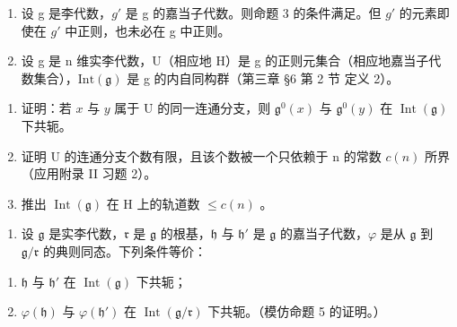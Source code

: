 
\begin{enumerate}
\def\labelenumi{\arabic{enumi})}
\item
  设 g 是李代数，\(g'\) 是 g 的嘉当子代数。则命题 3 的条件满足。但 \(g'\) 的元素即使在 \(g'\) 中正则，也未必在 g 中正则。
\item
  设 g 是 n 维实李代数，U（相应地 H）是 g 的正则元集合（相应地嘉当子代数集合），\(\text{Int}(\mathfrak{g})\) 是 g 的内自同构群（第三章 §6 第 2 节 定义 2）。
\end{enumerate}

\begin{enumerate}
\def\labelenumi{\alph{enumi})}
\item
  证明：若 \(x\) 与 \(y\) 属于 \(\mathrm{U}\) 的同一连通分支，则 \(\mathfrak{g}^0(x)\) 与 \(\mathfrak{g}^0(y)\) 在 \(\operatorname{Int}(\mathfrak{g})\) 下共轭。
\item
  证明 U 的连通分支个数有限，且该个数被一个只依赖于 n 的常数 \(c(n)\) 所界（应用附录 II 习题 2）。
\item
  推出 \(\operatorname{Int}(\mathfrak{g})\) 在 \(\mathrm{H}\) 上的轨道数 \(\leq c(n)\) 。
\end{enumerate}

\begin{enumerate}
\def\labelenumi{\arabic{enumi})}
\setcounter{enumi}{2}
\tightlist
\item
  设 \(\mathfrak{g}\) 是实李代数，\(\mathfrak{r}\) 是 \(\mathfrak{g}\) 的根基，\(\mathfrak{h}\) 与 \(\mathfrak{h}'\) 是 \(\mathfrak{g}\) 的嘉当子代数，\(\varphi\) 是从 \(\mathfrak{g}\) 到 \(\mathfrak{g} / \mathfrak{r}\) 的典则同态。下列条件等价：
\end{enumerate}

\begin{enumerate}
\def\labelenumi{(\roman{enumi})}
\item
  \(\mathfrak{h}\) 与 \(\mathfrak{h}'\) 在 \(\operatorname{Int}(\mathfrak{g})\) 下共轭；
\item
  \(\varphi(\mathfrak{h})\) 与 \(\varphi(\mathfrak{h}')\) 在 \(\operatorname{Int}(\mathfrak{g}/\mathfrak{r})\) 下共轭。（模仿命题 5 的证明。）
\end{enumerate}

